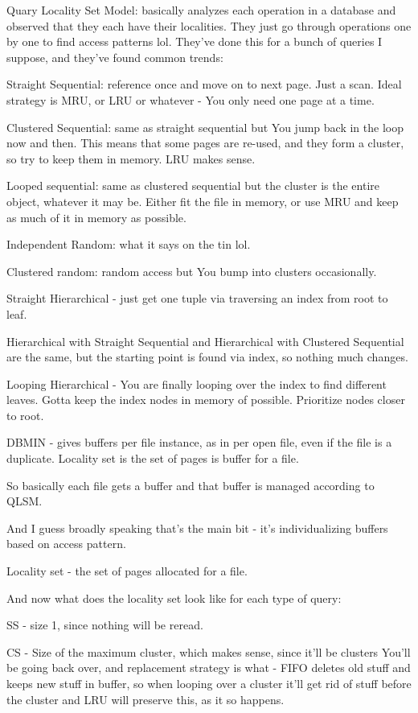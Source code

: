 \documentclass{article}
\begin{document}
	Quary Locality Set Model: basically analyzes each operation in a database and observed that they each have their localities. They just go through operations one by one to find access patterns lol. They've done this for a bunch of queries I suppose, and they've found common trends:
	
	Straight Sequential: reference once and move on to next page. Just a scan. Ideal strategy is MRU, or LRU or whatever - You only need one page at a time.
	
	Clustered Sequential: same as straight sequential but You jump back in the loop now and then. This means that some pages are re-used, and they form a cluster, so try to keep them in memory. LRU makes sense.
	
	Looped sequential: same as clustered sequential but the cluster is the entire object, whatever it may be. Either fit the file in memory, or use MRU and keep as much of it in memory as possible.
	
	Independent Random: what it says on the tin lol.
	
	Clustered random: random access but You bump into clusters occasionally.
	
	Straight Hierarchical - just get one tuple via traversing an index from root to leaf.
	
	Hierarchical with Straight Sequential and Hierarchical with Clustered Sequential are the same, but the starting point is found via index, so nothing much changes.
	
	Looping Hierarchical - You are finally looping over the index to find different leaves. Gotta keep the index nodes in memory of possible. Prioritize nodes closer to root.
	
	DBMIN - gives buffers per file instance, as in per open file, even if the file is a duplicate. Locality set is the set of pages is buffer for a file.
	
	So basically each file gets a buffer and that buffer is managed according to QLSM.
	
	And I guess broadly speaking that's the main bit - it's individualizing buffers based on access pattern.
	
	Locality set - the set of pages allocated for a file.
	
	And now what does the locality set look like for each type of query:
	
	SS - size 1, since nothing will be reread.
	
	CS - Size of the maximum cluster, which makes sense, since it'll be clusters You'll be going back over, and replacement strategy is what - FIFO deletes old stuff and keeps new stuff in buffer, so when looping over a cluster it'll get rid of stuff before the cluster and LRU will preserve this, as it so happens.
	
\end{document}

